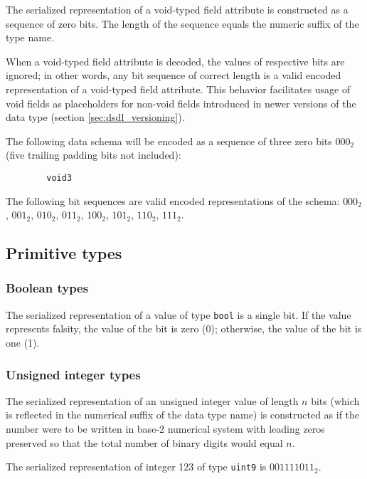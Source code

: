 The serialized representation of a void-typed field attribute is constructed as a sequence of zero bits.
The length of the sequence equals the numeric suffix of the type name.

When a void-typed field attribute is decoded, the values of respective bits are ignored;
in other words, any bit sequence of correct length is a valid encoded representation of a void-typed field attribute.
This behavior facilitates usage of void fields as placeholders for non-void fields
introduced in newer versions of the data type (section \ref{sec:dsdl_versioning}).

\begin{remark}
    The following data schema will be encoded as a sequence of three zero bits $000_2$
    (five trailing padding bits not included):
    \begin{verbatim}
        void3
    \end{verbatim}
    The following bit sequences are valid encoded representations of the schema:
    $000_2$,
    $001_2$,
    $010_2$,
    $011_2$,
    $100_2$,
    $101_2$,
    $110_2$,
    $111_2$.
\end{remark}

\subsection{Primitive types}

\subsubsection{Boolean types}\label{sec:dsdl_serialized_bool}

The serialized representation of a value of type \verb|bool| is a single bit.
If the value represents falsity, the value of the bit is zero (0); otherwise, the value of the bit is one (1).

\subsubsection{Unsigned integer types}\label{sec:dsdl_serialized_unsigned_integer}

The serialized representation of an unsigned integer value of length $n$ bits
(which is reflected in the numerical suffix of the data type name)
is constructed as if the number were to be written in base-2 numerical system
with leading zeros preserved so that the total number of binary digits would equal $n$.

\begin{remark}
    The serialized representation of integer 123 of type \verb|uint9| is $001111011_2$.
\end{remark}

